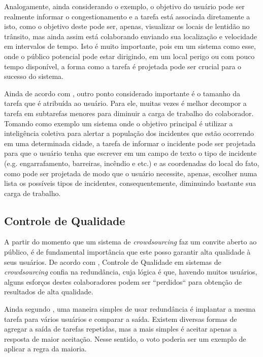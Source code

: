 Analogamente, ainda considerando o exemplo, o objetivo do usuário pode ser realmente informar o congestionamento e a tarefa está associada diretamente a isto, como o objetivo deste pode ser, apenas, visualizar os locais de lentidão no trânsito, mas ainda assim está colaborando enviando sua localização e velocidade em intervalos de tempo. Isto é muito importante, pois em um sistema como esse, onde o público potencial pode estar dirigindo, em um local perigo ou com pouco tempo disponível, a forma como a tarefa é projetada pode ser crucial para o sucesso do sistema.    

Ainda de acordo com \cite{Hu2012}, outro ponto considerado importante é o tamanho da tarefa que é atribuída ao usuário. Para ele, muitas vezes é melhor decompor a tarefa em subtarefas menores para diminuir a carga de trabalho do colaborador. Tomando como exemplo um sistema onde o objetivo principal é utilizar a inteligência coletiva para alertar a população dos incidentes que estão ocorrendo em uma determinada cidade, a tarefa de informar o incidente pode ser projetada para que o usuário tenha que escrever em um campo de texto o tipo de incidente (e.g. engarrafamento, barreiras, incêndio e etc.) e as coordenadas do local do fato, como pode ser projetada de modo que o usuário necessite, apenas, escolher numa lista os possíveis tipos de incidentes, consequentemente, diminuindo bastante sua carga de trabalho.  


\subsection{Controle de Qualidade}

A partir do momento que um sistema de \textit{crowdsourcing} faz um convite aberto ao público, é de fundamental importância que este posso garantir alta qualidade à seus usuários. De acordo com \cite{Hu2012}, Controle de Qualidade em sistemas de \textit{crowdsourcing}  confia na redundância, cuja lógica é que, havendo muitos usuários, alguns esforços destes colaboradores podem ser “perdidos“ para obtenção de resultados de alta qualidade.
	
Ainda segundo \cite{Hu2012}, uma maneira simples de usar redundância é implantar a mesma tarefa para vários usuários e comparar a saída. Existem diversas formas de agregar a saída de tarefas repetidas, mas a mais simples é aceitar apenas a resposta de maior aceitação. Nesse sentido, o voto poderia ser um exemplo de aplicar a regra da maioria.
	
